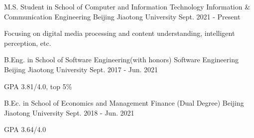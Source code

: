 

\begin{cventries}

    \cventry
    {M.S. Student in School of Computer and Information Technology} %
    {Information \& Communication Engineering} %
    {Beijing Jiaotong University} %
    {Sept. 2021 - Present} %
    {
        \begin{cvitems} %
            \item {Focusing on digital media processing and content understanding, intelligent perception, etc.}
        \end{cvitems}
    }

    \cventry
    {B.Eng. in School of Software Engineering(with honors)} %
    {Software Engineering} %
    {Beijing Jiaotong University} %
    {Sept. 2017 - Jun. 2021} %
    {
        \begin{cvitems} %
            \item {GPA 3.81/4.0, top 5\%}
        \end{cvitems}
    }

    \cventry
    {B.Ec. in School of Economics and Management} %
    {Finance (Dual Degree)} %
    {Beijing Jiaotong University} %
    {Sept. 2018 - Jun. 2021} %
    {
        \begin{cvitems} %
            \item {GPA 3.64/4.0}
        \end{cvitems}
    }

\end{cventries}
